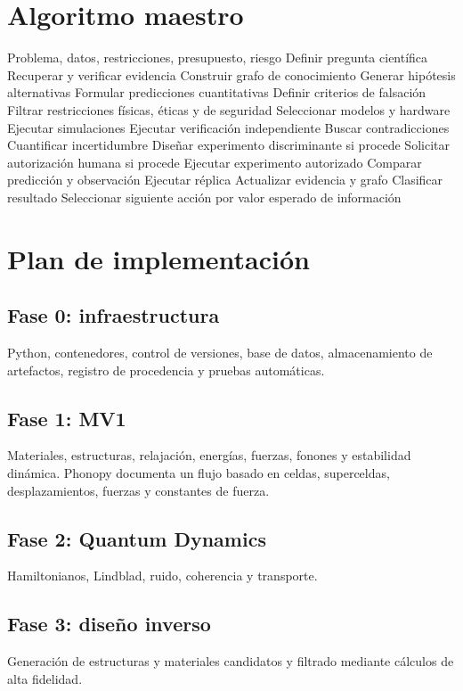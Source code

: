 \documentclass[11pt,a4paper]{article}
\begin{document}
\section{Algoritmo maestro}
\begin{algorithm}[H]
\caption{Ciclo universal de descubrimiento OMNISCIENCE}
\begin{algorithmic}[1]
\Require Problema, datos, restricciones, presupuesto, riesgo
\State Definir pregunta científica
\State Recuperar y verificar evidencia
\State Construir grafo de conocimiento
\State Generar hipótesis alternativas
\State Formular predicciones cuantitativas
\State Definir criterios de falsación
\State Filtrar restricciones físicas, éticas y de seguridad
\State Seleccionar modelos y hardware
\State Ejecutar simulaciones
\State Ejecutar verificación independiente
\State Buscar contradicciones
\State Cuantificar incertidumbre
\State Diseñar experimento discriminante si procede
\State Solicitar autorización humana si procede
\State Ejecutar experimento autorizado
\State Comparar predicción y observación
\State Ejecutar réplica
\State Actualizar evidencia y grafo
\State Clasificar resultado
\State Seleccionar siguiente acción por valor esperado de información
\end{algorithmic}
\end{algorithm}

\section{Plan de implementación}
\subsection{Fase 0: infraestructura}
Python, contenedores, control de versiones, base de datos, almacenamiento de artefactos, registro de procedencia y pruebas automáticas.
\subsection{Fase 1: MV1}
Materiales, estructuras, relajación, energías, fuerzas, fonones y estabilidad dinámica. Phonopy documenta un flujo basado en celdas, superceldas, desplazamientos, fuerzas y constantes de fuerza. \cite{phonopy}
\subsection{Fase 2: Quantum Dynamics}
Hamiltonianos, Lindblad, ruido, coherencia y transporte.
\subsection{Fase 3: diseño inverso}
Generación de estructuras y materiales candidatos y filtrado mediante cálculos de alta fidelidad.
\end{document}
